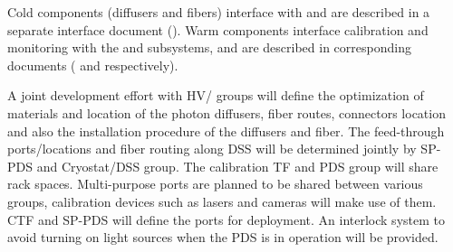 Cold components (diffusers and fibers) interface with  and are described in a separate interface document (). Warm components interface calibration and monitoring  with the  and  subsystems, and are described in corresponding documents ( and  respectively).


A joint development effort with HV/ groups will define the optimization of materials and location of the photon diffusers, fiber routes, connectors location and also the installation procedure of the diffusers and fiber. The feed-through ports/locations and fiber routing along DSS will be determined jointly by SP-PDS and Cryostat/DSS group. The calibration TF and PDS group will share rack spaces. Multi-purpose ports are planned to be shared between various groups, calibration devices such as lasers and cameras will make use of them. CTF and SP-PDS will define the ports for deployment. An interlock system to avoid turning on light sources when the PDS is in operation will be provided.







